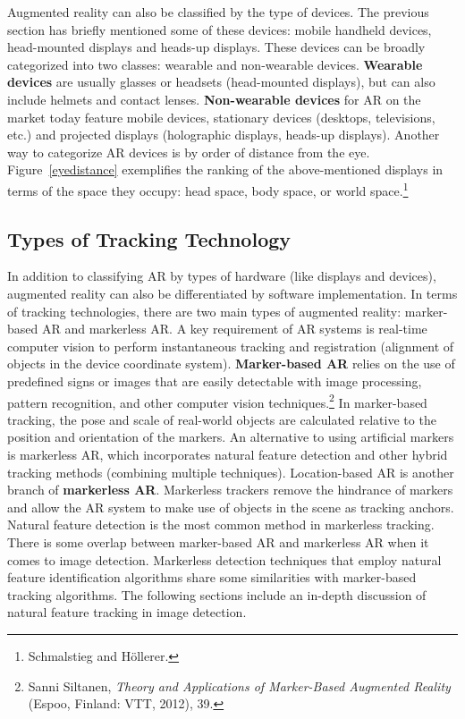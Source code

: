 Augmented reality can also be classified by the type of devices. The previous section has briefly mentioned some of these devices: mobile handheld devices, head-mounted displays and heads-up displays. These devices can be broadly categorized into two classes: wearable and non-wearable devices. \textbf{Wearable devices} are usually glasses or headsets (head-mounted displays), but can also include helmets and contact lenses. \textbf{Non-wearable devices} for AR on the market today feature mobile devices, stationary devices (desktops, televisions, etc.) and projected displays (holographic displays, heads-up displays). Another way to categorize AR devices is by order of distance from the eye. Figure~\ref{eyedistance} exemplifies the ranking of the above-mentioned displays in terms of the space they occupy: head space, body space, or world space.\footnote{Schmalstieg and Höllerer.}

\subsection{Types of Tracking Technology}\label{trackingtech}
In addition to classifying AR by types of hardware (like displays and devices), augmented reality can also be differentiated by software implementation. In terms of tracking technologies, there are two main types of augmented reality: marker-based AR and markerless AR. A key requirement of AR systems is real-time computer vision to perform instantaneous tracking and registration (alignment of objects in the device coordinate system). \textbf{Marker-based AR} relies on the use of predefined signs or images that are easily detectable with image processing, pattern recognition, and other computer vision techniques.\footnote{Sanni Siltanen, \textit{Theory and Applications of Marker-Based Augmented Reality} (Espoo, Finland: VTT, 2012), 39.} In marker-based tracking, the pose and scale of real-world objects are calculated relative to the position and orientation of the markers. An alternative to using artificial markers is markerless AR, which incorporates natural feature detection and other hybrid tracking methods (combining multiple techniques). Location-based AR is another branch of \textbf{markerless AR}. Markerless trackers remove the hindrance of markers and allow the AR system to make use of objects in the scene as tracking anchors. Natural feature detection is the most common method in markerless tracking. There is some overlap between marker-based AR and markerless AR when it comes to image detection. Markerless detection techniques that employ natural feature identification algorithms share some similarities with marker-based tracking algorithms. The following sections include an in-depth discussion of natural feature tracking in image detection.

